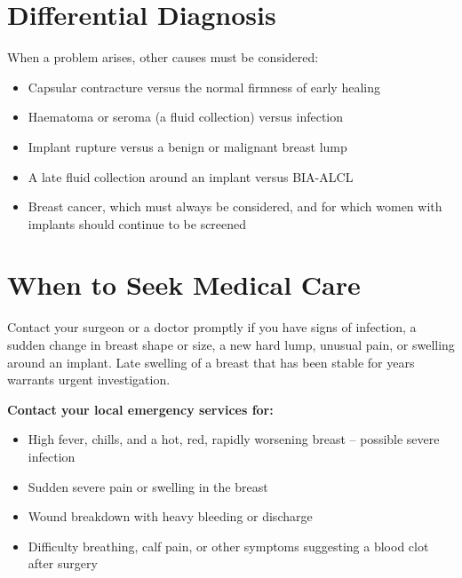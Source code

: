 \section*{Differential Diagnosis}
When a problem arises, other causes must be considered:

\begin{itemize}
    \item Capsular contracture versus the normal firmness of early healing
    \item Haematoma or seroma (a fluid collection) versus infection
    \item Implant rupture versus a benign or malignant breast lump
    \item A late fluid collection around an implant versus BIA-ALCL
    \item Breast cancer, which must always be considered, and for which women with implants should continue to be screened
\end{itemize}

\section*{When to Seek Medical Care}
Contact your surgeon or a doctor promptly if you have signs of infection, a sudden change in breast shape or size, a new hard lump, unusual pain, or swelling around an implant. Late swelling of a breast that has been stable for years warrants urgent investigation.

\textbf{Contact your local emergency services for:}
\begin{itemize}
    \item High fever, chills, and a hot, red, rapidly worsening breast -- possible severe infection
    \item Sudden severe pain or swelling in the breast
    \item Wound breakdown with heavy bleeding or discharge
    \item Difficulty breathing, calf pain, or other symptoms suggesting a blood clot after surgery
\end{itemize}

